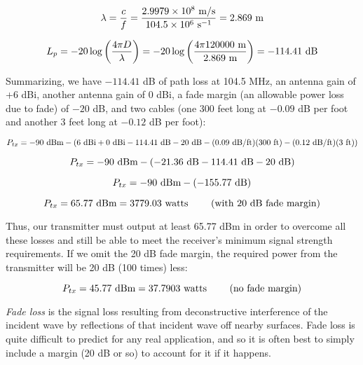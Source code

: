 \vskip 10pt

$$\lambda = {c \over f} = {2.9979 \times 10^8 \hbox{ m/s} \over 104.5 \times 10^6 \hbox{ s}^{-1}} = 2.869 \hbox{ m}$$

$$L_p = -20 \log \left(4 \pi D \over \lambda\right) = -20 \log \left(4 \pi 120000 \hbox{ m} \over 2.869 \hbox{ m} \right) = -114.41 \hbox{ dB}$$

\vskip 10pt

Summarizing, we have $-114.41$ dB of path loss at 104.5 MHz, an antenna gain of +6 dBi, another antenna gain of 0 dBi, a fade margin (an allowable power loss due to fade) of $-20$ dB, and two cables (one 300 feet long at $-0.09$ dB per foot and another 3 feet long at $-0.12$ dB per foot):

$$P_{tx} = -90 \hbox{ dBm} - (6 \hbox{ dBi} + 0 \hbox{ dBi} -114.41 \hbox{ dB} - 20 \hbox{ dB} -(0.09 \hbox{ dB/ft})(300 \hbox{ ft}) -(0.12 \hbox{ dB/ft})(3 \hbox{ ft}))$$

$$P_{tx} = -90 \hbox{ dBm} - ( -21.36 \hbox{ dB} -114.41 \hbox{ dB} - 20 \hbox{ dB} )$$

$$P_{tx} = -90 \hbox{ dBm} - (-155.77 \hbox{ dB})$$

$$P_{tx} = 65.77 \hbox{ dBm} = 3779.03 \hbox{ watts \hskip 20pt (with 20 dB fade margin)}$$

Thus, our transmitter must output at least 65.77 dBm in order to overcome all these losses and still be able to meet the receiver's minimum signal strength requirements.  If we omit the 20 dB fade margin, the required power from the transmitter will be 20 dB (100 times) less:

$$P_{tx} = 45.77 \hbox{ dBm} = 37.7903 \hbox{ watts \hskip 20pt (no fade margin)}$$

\vskip 10pt

{\it Fade loss} is the signal loss resulting from deconstructive interference of the incident wave by reflections of that incident wave off nearby surfaces.  Fade loss is quite difficult to predict for any real application, and so it is often best to simply include a margin (20 dB or so) to account for it if it happens.




